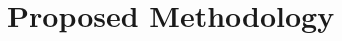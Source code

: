 \documentclass[letterpaper, 10 pt, conference]{ieeeconf}  %
\def\Re{\mathbb{R}}
\def\R{\mathbb{R}}
\newcommand{\field}[1]{\mathbb{#1}}
\def\Re{\field{R}}
\def\R{\mathbb{R}}
\newtheorem{assumption}{Assumption}
\newcommand{\ud}{\,\mathrm{d}}
\def\Re{\mathbb{R}}
\renewcommand{\Re}{\mathbb{R}}
\begin{document}
 \section{Proposed Methodology}
 \label{sec:methodology}



\end{document}
